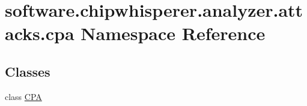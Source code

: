 \hypertarget{namespacesoftware_1_1chipwhisperer_1_1analyzer_1_1attacks_1_1cpa}{}\section{software.\+chipwhisperer.\+analyzer.\+attacks.\+cpa Namespace Reference}
\label{namespacesoftware_1_1chipwhisperer_1_1analyzer_1_1attacks_1_1cpa}
\subsection*{Classes}
\begin{DoxyCompactItemize}
\item 
class \hyperlink{classsoftware_1_1chipwhisperer_1_1analyzer_1_1attacks_1_1cpa_1_1CPA}{C\+P\+A}
\end{DoxyCompactItemize}
